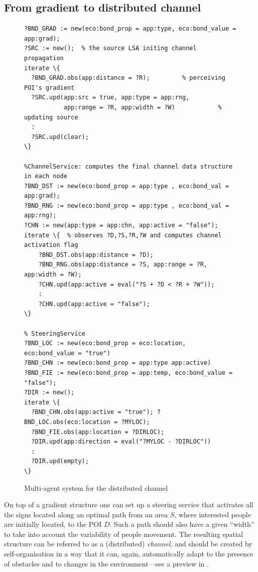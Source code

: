 \documentclass[12pt,a4paper,twoside,openright]{book}
\begin{document}
\subsection{From gradient to distributed channel}
\begin{figure}
{\footnotesize \begin{Verbatim}[samepage=true, frame=single, commandchars=\\\{\}]
% ChannelSource: initiates the channel propagation
?BND_GRAD := new(eco:bond_prop = app:type, eco:bond_value = app:grad);
?SRC := new();  % the source LSA initing channel propagation
iterate \{   
  ?BND_GRAD.obs(app:distance = ?R);         % perceiving POI's gradient
  ?SRC.upd(app:src = true, app:type = app:rng, 
           app:range = ?R, app:width = ?W)            % updating source
  :
  ?SRC.upd(clear);
\}

%ChannelService: computes the final channel data structure in each node 
?BND_DST := new(eco:bond_prop = app:type , eco:bond_val = app:grad);
?BND_RNG := new(eco:bond_prop = app:type , eco:bond_val = app:rng);
?CHN := new(app:type = app:chn, app:active = "false");
iterate \{  % observes ?D,?S,?R,?W and computes channel activation flag
    ?BND_DST.obs(app:distance = ?D);
    ?BND_RNG.obs(app:distance = ?S, app:range = ?R, app:width = ?W);
    ?CHN.upd(app:active = eval("?S + ?D < ?R + ?W"));
    :
    ?CHN.upd(app:active = "false");
\}

% SteeringService
?BND_LOC := new(eco:bond_prop = eco:location, eco:bond_value = "true")
?BND_CHN := new(eco:bond_prop = app:type app:active)
?BND_FIE := new(eco:bond_prop = app:temp, eco:bond_value = "false");
?DIR := new();
iterate \{
  ?BND_CHN.obs(app:active = "true"); ?BND_LOC.obs(eco:location = ?MYLOC); 
  ?BND_FIE.obs(app:location = ?DIRLOC); 
  ?DIR.upd(app:direction = eval("?MYLOC - ?DIRLOC"))
  :
  ?DIR.upd(empty); 
\}

\end{Verbatim}
}
\caption{Multi-agent system for the distributed channel}
\label{f:mas}
\end{figure}
%
On top of a gradient structure one can set up a steering service that activates all the signs located along an optimal path from an area $S$, where interested people are initially located, to the POI $D$. 
%
Such a path should also have a given ``width'' to take into account the variability of people movement.
%
The resulting spatial structure can be referred to as a (distributed) \emph{channel}, and should be created by self-organisation in a way that it can, again, automatically adapt to the presence of obstacles and to changes in the environment---see a preview in .
\end{document}

